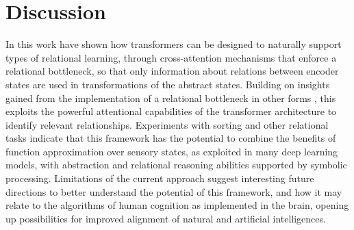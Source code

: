 \section{Discussion}
\label{sec:discuss}



In this work have shown how transformers
can be designed to
%
naturally support types of relational learning, through cross-attention
mechanisms that enforce a relational bottleneck, so that only information about relations between encoder states
are used in transformations of the abstract states.
Building on insights gained from the implementation of a relational bottleneck in other forms \citep{esbn, kerg2022neural}, this exploits the powerful attentional capabilities of the transformer architecture to identify relevant relationships.
Experiments with sorting and other relational tasks indicate that this framework has the potential to combine the
benefits of function approximation over sensory states, as exploited in many deep learning models, with abstraction and relational reasoning abilities
supported by symbolic processing.
Limitations of the current approach suggest interesting
future directions to better understand the potential of this framework, and
how it may relate to the algorithms of human cognition as implemented in the brain, opening up possibilities for 
improved alignment of natural and artificial intelligences.

